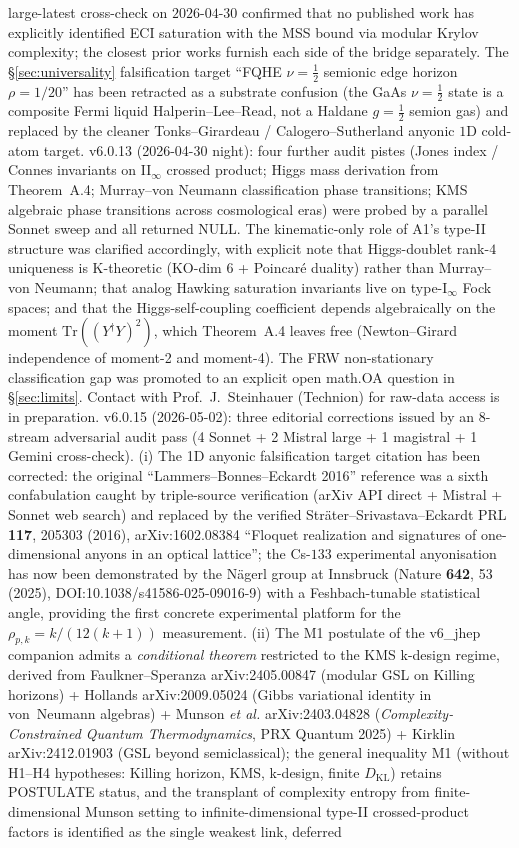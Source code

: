 \documentclass[reprint,amsmath,amssymb,aps,prd,superscriptaddress]{revtex4-2}
\providecommand{\1}{\mathbf{1}}
\begin{document}
large-latest cross-check on $2026$-$04$-$30$ confirmed that no published work has explicitly identified ECI saturation with the MSS bound via modular Krylov complexity; the closest prior works furnish each side of the bridge separately. The \S\ref{sec:universality} falsification target ``FQHE $\nu{=}\tfrac{1}{2}$ semionic edge horizon $\rho{=}1/20$'' has been retracted as a substrate confusion (the GaAs $\nu{=}\tfrac{1}{2}$ state is a composite Fermi liquid Halperin--Lee--Read, not a Haldane $g{=}\tfrac{1}{2}$ semion gas) and replaced by the cleaner Tonks--Girardeau / Calogero--Sutherland anyonic $1$D cold-atom target. v6.0.13 (2026-04-30 night): four further audit pistes (Jones index / Connes invariants on II$_\infty$ crossed product; Higgs mass derivation from Theorem~A.4; Murray--von Neumann classification phase transitions; KMS algebraic phase transitions across cosmological eras) were probed by a parallel Sonnet sweep and all returned NULL. The kinematic-only role of A1's type-II structure was clarified accordingly, with explicit note that Higgs-doublet rank-$4$ uniqueness is K-theoretic (KO-dim $6$ + Poincaré duality) rather than Murray--von Neumann; that analog Hawking saturation invariants live on type-I$_\infty$ Fock spaces; and that the Higgs-self-coupling coefficient depends algebraically on the moment $\mathrm{Tr}((Y^\dagger Y)^2)$, which Theorem~A.4 leaves free (Newton--Girard independence of moment-2 and moment-4). The FRW non-stationary classification gap was promoted to an explicit open math.OA question in \S\ref{sec:limits}. Contact with Prof.\ J.\ Steinhauer (Technion) for raw-data access is in preparation. v6.0.15 (2026-05-02): three editorial corrections issued by an 8-stream adversarial audit pass (4 Sonnet + 2 Mistral large + 1 magistral + 1 Gemini cross-check). (i) The 1D anyonic falsification target citation has been corrected: the original ``Lammers--Bonnes--Eckardt 2016'' reference was a sixth confabulation caught by triple-source verification (arXiv API direct + Mistral + Sonnet web search) and replaced by the verified Str\"ater--Srivastava--Eckardt PRL \textbf{117}, 205303 (2016), arXiv:1602.08384 ``Floquet realization and signatures of one-dimensional anyons in an optical lattice''; the Cs-$133$ experimental anyonisation has now been demonstrated by the N\"agerl group at Innsbruck (Nature \textbf{642}, 53 (2025), DOI:10.1038/s41586-025-09016-9) with a Feshbach-tunable statistical angle, providing the first concrete experimental platform for the $\rho_{p,k} = k/(12(k+1))$ measurement. (ii) The M1 postulate of the v6\_jhep companion admits a \emph{conditional theorem} restricted to the KMS k-design regime, derived from Faulkner--Speranza arXiv:2405.00847 (modular GSL on Killing horizons) + Hollands arXiv:2009.05024 (Gibbs variational identity in von~Neumann algebras) + Munson \emph{et al.} arXiv:2403.04828 (\emph{Complexity-Constrained Quantum Thermodynamics}, PRX Quantum 2025) + Kirklin arXiv:2412.01903 (GSL beyond semiclassical); the general inequality M1 (without H1--H4 hypotheses: Killing horizon, KMS, k-design, finite $D_\mathrm{KL}$) retains POSTULATE status, and the transplant of complexity entropy from finite-dimensional Munson setting to infinite-dimensional type-II crossed-product factors is identified as the single weakest link, deferred 
\end{document}

